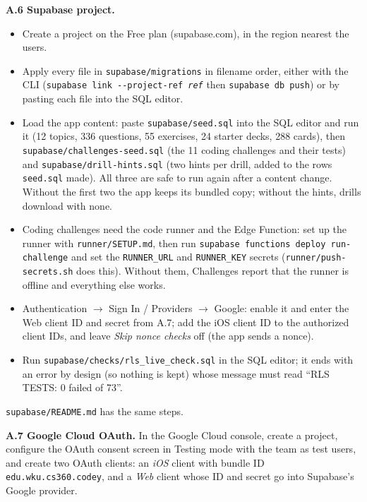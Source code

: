 \documentclass[12pt,letterpaper]{article}
\begin{document}
\textbf{A.6 Supabase project.}
\begin{itemize}
  \item Create a project on the Free plan (supabase.com), in the region nearest the
        users.
  \item Apply every file in \texttt{supabase/migrations} in filename order, either with
        the CLI (\texttt{supabase link -{}-project-ref \textit{ref}} then
        \texttt{supabase db push}) or by pasting each file into the SQL editor.
  \item Load the app content: paste \texttt{supabase/seed.sql} into the SQL editor and
        run it (12 topics, 336 questions, 55 exercises, 24 starter decks, 288 cards),
        then \texttt{supabase/challenges-seed.sql} (the 11 coding challenges and their
        tests) and \texttt{supabase/drill-hints.sql} (two hints per drill, added to the
        rows \texttt{seed.sql} made). All three are safe to run again after a content
        change. Without the first two the app keeps its bundled copy; without the
        hints, drills download with none.
  \item Coding challenges need the code runner and the Edge Function: set up the
        runner with \texttt{runner/SETUP.md}, then run
        \texttt{supabase functions deploy run-challenge} and set the
        \texttt{RUNNER\_URL} and \texttt{RUNNER\_KEY} secrets
        (\texttt{runner/push-secrets.sh} does this). Without them, Challenges
        report that the runner is offline and everything else works.
  \item Authentication $\to$ Sign In / Providers $\to$ Google: enable it and enter the
        Web client ID and secret from A.7; add the iOS client ID to the authorized
        client IDs, and leave \emph{Skip nonce checks} off (the app sends a nonce).
  \item Run \texttt{supabase/checks/rls\_live\_check.sql} in the SQL editor; it ends
        with an error by design (so nothing is kept) whose message must read
        ``RLS TESTS: 0 failed of 73''.
\end{itemize}
\texttt{supabase/README.md} has the same steps.

\textbf{A.7 Google Cloud OAuth.} In the Google Cloud console, create a project, configure
the OAuth consent screen in Testing mode with the team as test users, and create two
OAuth clients: an \emph{iOS} client with bundle ID \texttt{edu.wku.cs360.codey}, and a
\emph{Web} client whose ID and secret go into Supabase's Google provider.
\end{document}
